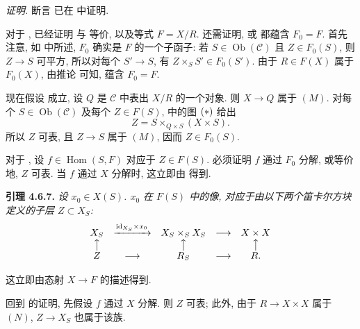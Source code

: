 \noindent\textit{证明.}
断言 
已在  中证明.

对于 ,
已经证明  与
 等价, 以及等式 \(F=X/R\).
还需证明,  或
 都蕴含 \(F_0=F\).
首先注意, 如 中所述,
\(F_0\) 确实是 \(F\) 的一个子函子:
若 \(S\in\operatorname{Ob}(\mathscr C)\) 且 \(Z\in F_0(S)\),
则 \(Z\to S\) 可平方, 所以对每个 \(S'\to S\), 有
\(Z\times_SS'\in F_0(S')\).
由于 \(R\in F(X)\) 属于 \(F_0(X)\),
由推论  可知,
 蕴含 \(F_0=F\).

现在假设  成立,
设 \(Q\) 是 \(\mathscr C\) 中表出 \(X/R\) 的一个对象.
则 \(X\to Q\) 属于 \((M)\).
对每个 \(S\in\operatorname{Ob}(\mathscr C)\) 及每个 \(Z\in F(S)\),
 中的图
\(\SGARefLink{sga3:iv:proposition:4:6:1:eq:unnamed:01}{(*)}\) 给出
\[
 Z=S\times_{Q\times S}(X\times S).
\]
所以 \(Z\) 可表, 且 \(Z\to S\) 属于 \((M)\), 因而 \(Z\in F_0(S)\).

对于 ,
设 \(f\in\operatorname{Hom}(S,F)\) 对应于 \(Z\in F(S)\).
必须证明 \(f\) 通过 \(F_0\) 分解,
或等价地, \(Z\) 可表.
当 \(f\) 通过 \(X\) 分解时, 这立即由 得到.

\medskip
\noindent{}\textbf{引理 4.6.7.}
\textit{设 \(x_0\in X(S)\).
\(x_0\) 在 \(F(S)\) 中的像,
对应于由以下两个笛卡尔方块定义的子层 \(Z\subset X_S\):}
\[
\begin{array}{ccccc}
 X_S&\xrightarrow{\mathrm{id}_{X_S}\times x_0}&
 X_S\times_SX_S&\longrightarrow&X\times X\cr
 \big\uparrow&&\big\uparrow&&\big\uparrow\cr
 Z&\longrightarrow&R_S&\longrightarrow&R.
\end{array}
\]

这立即由态射 \(X\to F\) 的描述得到.

回到 的证明,
先假设 \(f\) 通过 \(X\) 分解.
则 \(Z\) 可表; 此外, 由于 \(R\to X\times X\) 属于 \((N)\),
\(Z\to X_S\) 也属于该族.

